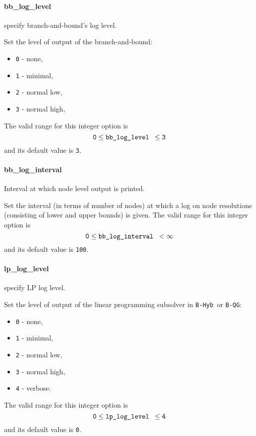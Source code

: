 

\label{app:opt_loglevel}
\paragraph{bb\_log\_level}
\label{bb_log_level} specify branch-and-bound's log level.

 Set the level of output of the branch-and-bound:
 \begin{itemize}
  \item {\tt 0} - none,
  \item {\tt 1} - minimal,
  \item {\tt 2} - normal low,
  \item {\tt 3} - normal high,
  \end{itemize}
 The valid range for this integer option is
 $${\tt 0} \le \hbox{\tt bb\_log\_level } \le {\tt 3}$$
and its default value is {\tt 3}.


\paragraph{bb\_log\_interval} 
\label{bb_log_interval}
Interval at which node level output is printed.

 Set the interval (in terms of number of nodes) at
which a log on node resolutions (consisting of
lower and upper bounds) is given. The valid range for this integer option is
$${\tt 0} \le \hbox{\tt bb\_log\_interval } <  \infty$$
and its default value is {\tt 100}.


\paragraph{lp\_log\_level}
\label{lp_log_level}
 specify LP log level.

 Set the level of output of the linear programming
subsolver in {\tt B-Hyb }or {\tt B-QG}:
 \begin{itemize}
  \item {\tt 0} - none,
  \item {\tt 1} - minimal,
  \item {\tt 2} - normal low,
  \item {\tt 3} - normal high,
  \item {\tt 4} - verbose.
  \end{itemize}
The valid range for this integer option is
$${\tt 0} \le \hbox{\tt lp\_log\_level } \le {\tt 4}$$
and its default value is {\tt 0}.


